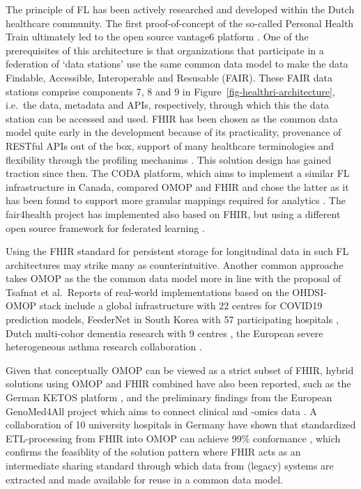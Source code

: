 \documentclass[
  authoryear]{elsarticle}
\begin{document}
The principle of FL has been actively researched and developed within
the Dutch healthcare community. The first proof-of-concept of the
so-called Personal Health Train
\citep{vansoest2018using, choudhury2020personal} ultimately led to the
open source vantage6 platform \citep{smits2022improved}. One of the
prerequisites of this architecture is that organizations that
participate in a federation of `data stations' use the same common data
model to make the data Findable, Accessible, Interoperable and Resusable
(FAIR). These FAIR data stations comprise components 7, 8 and 9 in
Figure~\ref{fig-healthri-architecture}, i.e.~the data, metadata and
APIs, respectively, through which this the data station can be accessed
and used. FHIR has been chosen as the common data model quite early in
the development because of its practicality, provenance of RESTful APIs
out of the box, support of many healthcare terminologies and flexibility
through the profiling mechanims \citep{choudhury2020personal}. This
solution design has gained traction since then. The CODA platform, which
aims to implement a similar FL infrastructure in Canada, compared OMOP
and FHIR and chose the latter as it has been found to support more
granular mappings required for analytics \citep{mullie2023coda}. The
fair4health project has implemented also based on FHIR, but using a
different open source framework for federated learning
\citep{sinaci2024privacypreserving}.

Using the FHIR standard for persistent storage for longitudinal data in
such FL architectures may strike many as counterintuitive. Another
common approache takes OMOP as the the common data model more in line
with the proposal of Tsafnat et al.~Reports of real-world
implementations based on the OHDSI-OMOP stack include a global
infrastructure with 22 centres for COVID19 prediction
models\citep{khalid2021standardized}, FeederNet in South Korea with 57
participating hospitals \citep{lee2022feedernet}, Dutch multi-cohor
dementia research with 9 centres \citep{mateus2024data}, the European
severe heterogeneous asthma research collaboration
\citep{kroes2022blueprint}.

Given that conceptually OMOP can be viewed as a strict subset of FHIR,
hybrid solutions using OMOP and FHIR combined have also been reported,
such as the German KETOS platform \citep{gruendner2019ketos}, and the
preliminary findings from the European GenoMed4All project which aims to
connect clinical and -omics data \citep{cremonesi2023need}. A
collaboration of 10 university hospitals in Germany have shown that
standardized ETL-processing from FHIR into OMOP can achieve 99\%
conformance \citep{peng2023etlprocess}, which confirms the feasiblity of
the solution pattern where FHIR acts as an intermediate sharing standard
through which data from (legacy) systems are extracted and made
available for reuse in a common data model.
\end{document}
